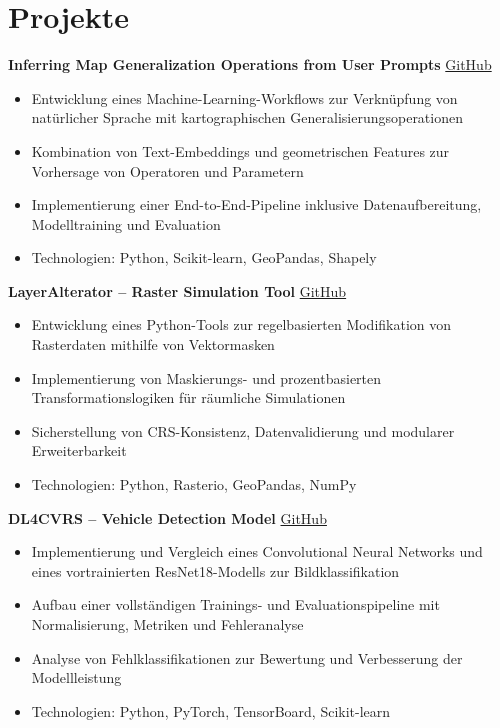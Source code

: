 \documentclass[a4paper,10pt]{article}
\begin{document}
\section*{Projekte}

\textbf{Inferring Map Generalization Operations from User Prompts} \hfill \href{https://github.com/AmirDonyadide/nl2map-generalization}{GitHub}\\
\begin{itemize}[leftmargin=1.5em, noitemsep]
    \item Entwicklung eines Machine-Learning-Workflows zur Verknüpfung von natürlicher Sprache mit kartographischen Generalisierungsoperationen
    \item Kombination von Text-Embeddings und geometrischen Features zur Vorhersage von Operatoren und Parametern
    \item Implementierung einer End-to-End-Pipeline inklusive Datenaufbereitung, Modelltraining und Evaluation
    \item Technologien: Python, Scikit-learn, GeoPandas, Shapely
\end{itemize}

\vspace{0.35em}

\textbf{LayerAlterator -- Raster Simulation Tool} \hfill \href{https://github.com/AmirDonyadide/LayerAlterator}{GitHub}\\
\begin{itemize}[leftmargin=1.5em, noitemsep]
    \item Entwicklung eines Python-Tools zur regelbasierten Modifikation von Rasterdaten mithilfe von Vektormasken
    \item Implementierung von Maskierungs- und prozentbasierten Transformationslogiken für räumliche Simulationen
    \item Sicherstellung von CRS-Konsistenz, Datenvalidierung und modularer Erweiterbarkeit
    \item Technologien: Python, Rasterio, GeoPandas, NumPy
\end{itemize}

\vspace{0.35em}

\textbf{DL4CVRS -- Vehicle Detection Model} \hfill \href{https://github.com/AmirDonyadide/DL4CVRS}{GitHub}\\
\begin{itemize}[leftmargin=1.5em, noitemsep]
    \item Implementierung und Vergleich eines Convolutional Neural Networks und eines vortrainierten ResNet18-Modells zur Bildklassifikation
    \item Aufbau einer vollständigen Trainings- und Evaluationspipeline mit Normalisierung, Metriken und Fehleranalyse
    \item Analyse von Fehlklassifikationen zur Bewertung und Verbesserung der Modellleistung
    \item Technologien: Python, PyTorch, TensorBoard, Scikit-learn
\end{itemize}
\end{document}
